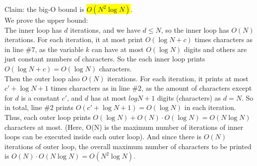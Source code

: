 \documentclass[12pt]{article}
\begin{document}
\noindent Claim: the big-O bound is \colorbox{yellow}{$O(N^2 \log N)$}.\\
We prove the upper bound:\\
The inner loop has $d$ iterations, and we have $d \leq N$, so the inner loop has $O(N)$ iterations. For each iteration, it at most print $O(\log N + c)$ times characters as in line \#$7$, as the variable $k$ can have at most $O(\log N)$ digits and others are just constant numbers of characters. So the each inner loop prints $O(\log N + c) = O(\log N)$ characters.\\
 Then the outer loop also $O(N)$ iterations. For each iteration, it prints at most $c' + \log N + 1$ times characters as in line \#$2$, as the amount of characters except for $d$ is a constant $c'$, and $d$ has at most $log N + 1$ digits (characters) as $d = N$. So in total, line \#$2$ prints $O(c' + \log N + 1) = O(\log N)$ in each iteration. Thus, each outer loop prints $O(\log N) + O(N)\cdot O(\log N) = O(N \log N)$ characters at most. (Here, O(N) is the maximum number of iterations of inner loops can be executed inside each outer loop). And since there is $O(N)$ iterations of outer loop, the overall maximum number of characters to be printed is $O(N)\cdot O(N \log N) = O(N^2 \log N)$.
\par\null\par
\end{document}
